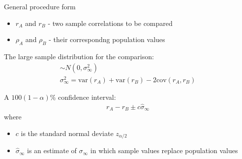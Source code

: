 \documentclass[10pt,pdf]{beamer}
\newcommand{\var}{\mathrm{var}}
\newcommand{\cov}{\mathrm{cov}}
\begin{document}

\begin{frame}[t]{General procedure form}

\begin{itemize}
  \item $r_A$ and $r_B$ - two sample correlations to be compared
  \item $\rho_A$ and $\rho_B$ - their correspondng population values
\end{itemize}

\medskip

The large sample distribution for the comparison:
\begin{gather*}
  [(r_A - r_B) - (\rho_A - \rho_B)] \sim N(0, \sigma_{\infty}^2) \\
  \sigma_{\infty}^2 = \var(r_A) + \var(r_B) - 2 \cov(r_A, r_B)
\end{gather*}

\medskip

A $100(1 - \alpha)$\% confidence interval:
\begin{align*}
  r_A - r_B \pm c \hat{\sigma}_{\infty}
\end{align*}
where
\begin{itemize}
  \item $c$ is the standard normal deviate $z_{\alpha / 2}$
  \item $\hat{\sigma}_{\infty}$ is an estimate of $\sigma_{\infty}$ in which sample values replace population values
\end{itemize}

\end{frame}

\end{document}
